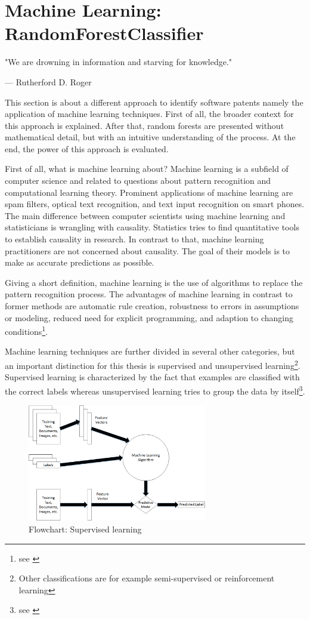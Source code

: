 \documentclass[12pt, a4paper, abstract, parskip]{scrartcl}
\theoremstyle{definition}
\begin{document}
\section{Machine Learning: RandomForestClassifier} %
\label{sub:machine_learning_randomforestclassifier}

\epigraph{"We are drowning in information and starving for knowledge."}{---
\textup{Rutherford D. Roger}}

This section is about a different approach to identify software patents namely
the application of machine learning techniques. First of all, the broader
context for this approach is explained. After that, random forests are
presented without mathematical detail, but with an intuitive understanding of
the process. At the end, the power of this approach is evaluated.

First of all, what is machine learning about? Machine learning is a subfield of
computer science and related to questions about pattern recognition and
computational learning theory. Prominent applications of machine learning are
spam filters, optical text recognition, and text input recognition on smart
phones. The main difference between computer scientists using machine learning
and statisticians is wrangling with causality. Statistics tries to find
quantitative tools to establish causality in research. In contrast to that,
machine learning practitioners are not concerned about causality. The goal of
their models is to make as accurate predictions as possible.

Giving a short definition, machine learning is the use of algorithms to replace
the pattern recognition process. The advantages of machine learning in contrast
to former methods are automatic rule creation, robustness to errors in
assumptions or modeling, reduced need for explicit programming, and adaption to
changing conditions\footnote{see \cite{kulkarni2011elementary}}.

Machine learning techniques are further divided in several other categories,
but an important distinction for this thesis is supervised and unsupervised
learning\footnote{Other classifications are for example semi-supervised or
reinforcement learning}. Supervised learning is characterized by the fact that
examples are classified with the correct labels whereas unsupervised learning
tries to group the data by itself\footnote{see \cite{kulkarni2011elementary}}.

\begin{figure}[tb]
	\centering
	\includegraphics[width = 0.7\textwidth]{graphics/ml_flowchart.png}
	\caption{Flowchart: Supervised learning}
	\label{fig:figure1}
\end{figure}
\end{document}
